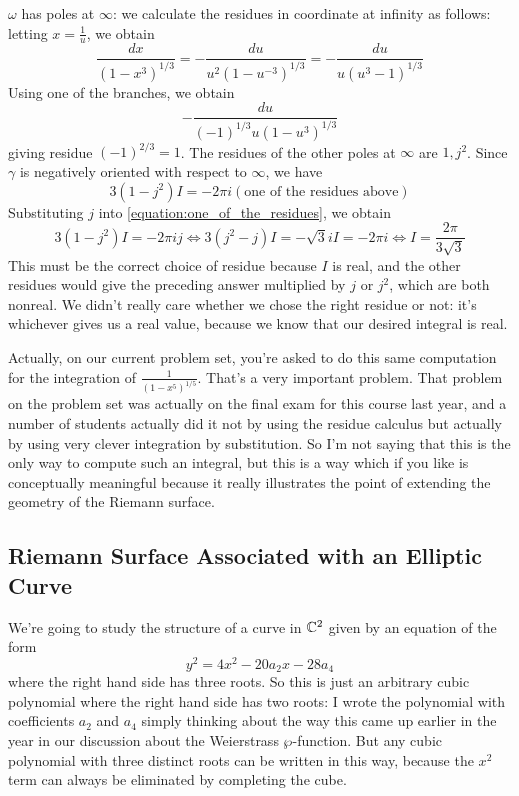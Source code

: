 \documentclass{article}
\begin{document}
\(\omega\) has poles at \(\infty\): we calculate the residues in coordinate at infinity as follows: letting \(x = \frac{1}{u}\), we obtain
\begin{equation}
  \frac{dx}{(1 - x^3)^{1/3}}
  = -\frac{du}{u^2(1 - u^{-3})^{1/3}}
  = -\frac{du}{u(u^3 - 1)^{1/3}}
\end{equation}
Using one of the branches, we obtain
\begin{equation}
  -\frac{du}{(-1)^{1/3}u(1 - u^3)^{1/3}}
\end{equation}
giving residue \((-1)^{2/3} = 1\). The residues of the other poles at \(\infty\) are \(1, j^2\). Since \(\gamma\) is negatively oriented with respect to \(\infty\), we have
\begin{equation}
  3(1 - j^2)I = -2\pi i(\text{one of the residues above})
  \label{equation:one_of_the_residues}
\end{equation}
Substituting \(j\) into \ref{equation:one_of_the_residues}, we obtain
\begin{equation}
  3(1 - j^2)I = -2\pi ij \iff 3(j^2 - j)I = -\sqrt{3}iI = -2\pi i \iff I = \frac{2\pi}{3\sqrt{3}}
\end{equation}
This must be the correct choice of residue because \(I\) is real, and the other residues would give the preceding answer multiplied by \(j\) or \(j^2\), which are both nonreal. We didn't really care whether we chose the right residue or not: it's whichever gives us a real value, because we know that our desired integral is real.

Actually, on our current problem set, you're asked to do this same computation for the integration of \(\frac{1}{(1 - x^5)^{1/5}}\). That's a very important problem. That problem on the problem set was actually on the final exam for this course last year, and a number of students actually did it not by using the residue calculus but actually by using very clever integration by substitution. So I'm not saying that this is the only way to compute such an integral, but this is a way which if you like is conceptually meaningful because it really illustrates the point of extending the geometry of the Riemann surface.

\subsection{Riemann Surface Associated with an Elliptic Curve}

We're going to study the structure of a curve in \(\mathbb{C}^2\) given by an equation of the form
\begin{equation}
  y^2 = 4x^2 - 20a_2x - 28a_4
\end{equation}
where the right hand side has three roots. So this is just an arbitrary cubic polynomial where the right hand side has two roots: I wrote the polynomial with coefficients \(a_2\) and \(a_4\) simply thinking about the way this came up earlier in the year in our discussion about the Weierstrass \(\wp\)-function. But any cubic polynomial with three distinct roots can be written in this way, because the \(x^2\) term can always be eliminated by completing the cube.
\end{document}
